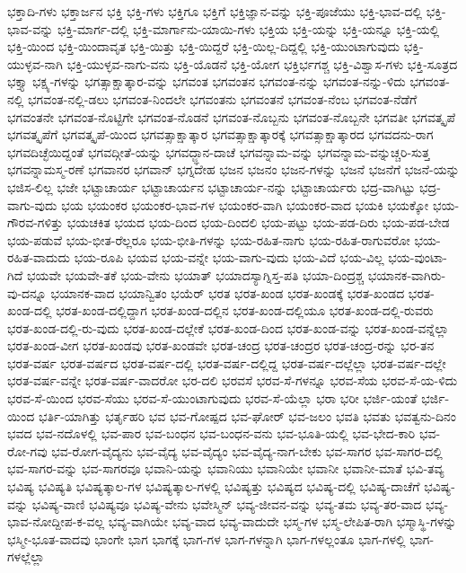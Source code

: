 {ಭಕ್ತಾದಿ-ಗಳು
ಭಕ್ತಾರ್ಜನ
ಭಕ್ತಿ
ಭಕ್ತಿ-ಗಳು
ಭಕ್ತಿಗೂ
ಭಕ್ತಿಗೆ
ಭಕ್ತಿಜ್ಞಾನ-ವನ್ನು
ಭಕ್ತಿ-ಪೂಜೆಯು
ಭಕ್ತಿ-ಭಾವ-ದಲ್ಲಿ
ಭಕ್ತಿ-ಭಾವ-ವನ್ನು
ಭಕ್ತಿ-ಮಾರ್ಗ-ದಲ್ಲಿ
ಭಕ್ತಿ-ಮಾರ್ಗಾನು-ಯಾಯಿ-ಗಳು
ಭಕ್ತಿಯ
ಭಕ್ತಿ-ಯನ್ನು
ಭಕ್ತಿ-ಯನ್ನೂ
ಭಕ್ತಿ-ಯಲ್ಲಿ
ಭಕ್ತಿ-ಯಿಂದ
ಭಕ್ತಿ-ಯಿಂದಾವೃತ
ಭಕ್ತಿ-ಯಿತ್ತು
ಭಕ್ತಿ-ಯಿದ್ದರೆ
ಭಕ್ತಿ-ಯಿಲ್ಲ-ದಿದ್ದಲ್ಲಿ
ಭಕ್ತಿ-ಯುಂಟಾಗುವುದು
ಭಕ್ತಿ-ಯುಳ್ಳವ-ನಾಗಿ
ಭಕ್ತಿ-ಯುಳ್ಳವ-ನಾಗು-ವನು
ಭಕ್ತಿ-ಯೊಡನೆ
ಭಕ್ತಿ-ಯೋಗ
ಭಕ್ತಿರ್ಭಗಶ್ಚ
ಭಕ್ತಿ-ವಿಶ್ವಾಸ-ಗಳು
ಭಕ್ತಿ-ಸೂತ್ರದ
ಭಕ್ತ್ಯಾ
ಭಕ್ಷ್ಯ-ಗಳನ್ನು
ಭಗತ್ಸಾಕ್ಷಾತ್ಕಾರ-ವನ್ನು
ಭಗವಂತ
ಭಗವಂತನ
ಭಗವಂತ-ನನ್ನು
ಭಗವಂತ-ನನ್ನು-ಳಿದು
ಭಗವಂತ-ನಲ್ಲಿ
ಭಗವಂತ-ನಲ್ಲಿ-ಡಲು
ಭಗವಂತ-ನಿಂದಲೇ
ಭಗವಂತನು
ಭಗವಂತನೆ
ಭಗವಂತ-ನೆಂಬ
ಭಗವಂತ-ನೆಡೆಗೆ
ಭಗವಂತನೇ
ಭಗವಂತ-ನೊಟ್ಟಿಗೇ
ಭಗವಂತ-ನೊಡನೆ
ಭಗವಂತ-ನೊಬ್ಬನು
ಭಗವಂತ-ನೊಬ್ಬನೇ
ಭಗವತೀ
ಭಗವತ್ಕೃಪೆ
ಭಗವತ್ಕೃಪೆಗೆ
ಭಗವತ್ಕೃಪೆ-ಯಿಂದ
ಭಗವತ್ಸಾಕ್ಷಾತ್ಕಾರ
ಭಗವತ್ಸಾಕ್ಷಾತ್ಕಾರಕ್ಕೆ
ಭಗವತ್ಸಾಕ್ಷಾತ್ಕಾರದ
ಭಗವದನು-ರಾಗ
ಭಗವದಿಚ್ಛೆಯಿದ್ದಂತೆ
ಭಗವದ್ಗೀತೆ-ಯನ್ನು
ಭಗವದ್ಜ್ಞಾನ-ದಾಚೆ
ಭಗವನ್ನಾಮ-ವನ್ನು
ಭಗವನ್ನಾಮ-ವನ್ನುಚ್ಚರಿ-ಸುತ್ತ
ಭಗವನ್ನಾಮಸ್ಮ-ರಣೆ
ಭಗವಾನರ
ಭಗವಾನ್
ಭಗ್ನದೇಹ
ಭಜನ
ಭಜನಂ
ಭಜನ-ಗಳನ್ನು
ಭಜನೆ
ಭಜನೆಗೆ
ಭಜನೆ-ಯನ್ನು
ಭಜಿಸ-ಲಿಲ್ಲ
ಭಜೇ
ಭಟ್ಟಾಚಾರ್ಯ
ಭಟ್ಟಾಚಾರ್ಯನ
ಭಟ್ಟಾಚಾರ್ಯ-ನನ್ನು
ಭಟ್ಟಾಚಾರ್ಯರು
ಭದ್ರ-ವಾಗಿಟ್ಟು
ಭದ್ರ-ವಾಗು-ವುದು
ಭಯ
ಭಯಂಕರ
ಭಯಂಕರ-ಭಾವ-ಗಳ
ಭಯಂಕರ-ವಾಗಿ
ಭಯಂಕರ-ವಾದ
ಭಯಕಿ
ಭಯಕ್ಕೋ
ಭಯ-ಗೌರವ-ಗಳಿತ್ತು
ಭಯಚಕಿತ
ಭಯದ
ಭಯ-ದಿಂದ
ಭಯ-ದಿಂದಲಿ
ಭಯ-ಪಟ್ಟು
ಭಯ-ಪಡ-ದಿರು
ಭಯ-ಪಡ-ಬೇಡ
ಭಯ-ಪಡುವೆ
ಭಯ-ಭೀತ-ರೆಲ್ಲರೂ
ಭಯ-ಭೀತಿ-ಗಳನ್ನು
ಭಯ-ರಹಿತ-ನಾಗು
ಭಯ-ರಹಿತ-ರಾಗುವರೋ
ಭಯ-ರಹಿತ-ವಾದುದು
ಭಯ-ರೂಪಿ
ಭಯವ
ಭಯ-ವನ್ನೇ
ಭಯ-ವಾಗು-ವುದು
ಭಯ-ವಿದೆ
ಭಯ-ವಿಲ್ಲ
ಭಯ-ವುಂಟಾ-ಗಿದೆ
ಭಯವೇ
ಭಯವೇ-ತಕೆ
ಭಯ-ವೇನು
ಭಯಾತ್
ಭಯಾದಸ್ಯಾಗ್ನಿಸ್ತ-ಪತಿ
ಭಯಾ-ದಿಂದ್ರಶ್ಚ
ಭಯಾನಕ-ವಾಗಿರು-ವು-ದನ್ನೂ
ಭಯಾನಕ-ವಾದ
ಭಯಾನ್ವಿತಂ
ಭಯೆರ್
ಭರತ
ಭರತ-ಖಂಡ
ಭರತ-ಖಂಡಕ್ಕೆ
ಭರತ-ಖಂಡದ
ಭರತ-ಖಂಡ-ದಲ್ಲಿ
ಭರತ-ಖಂಡ-ದಲ್ಲಿದ್ದಾಗ
ಭರತ-ಖಂಡ-ದಲ್ಲಿನ
ಭರತ-ಖಂಡ-ದಲ್ಲಿಯೂ
ಭರತ-ಖಂಡ-ದಲ್ಲಿ-ರುವರು
ಭರತ-ಖಂಡ-ದಲ್ಲಿ-ರು-ವುದು
ಭರತ-ಖಂಡ-ದಲ್ಲೇಕೆ
ಭರತ-ಖಂಡ-ದಿಂದ
ಭರತ-ಖಂಡ-ವನ್ನು
ಭರತ-ಖಂಡ-ವನ್ನೆಲ್ಲಾ
ಭರತ-ಖಂಡ-ವೀಗ
ಭರತ-ಖಂಡವು
ಭರತ-ಖಂಡವೇ
ಭರತ-ಚಂದ್ರ
ಭರತ-ಚಂದ್ರರ
ಭರತ-ಚಂದ್ರ-ರನ್ನು
ಭರ-ತನ
ಭರತ-ವರ್ಷ
ಭರತ-ವರ್ಷದ
ಭರತ-ವರ್ಷ-ದಲ್ಲಿ
ಭರತ-ವರ್ಷ-ದಲ್ಲಿದ್ದ
ಭರತ-ವರ್ಷ-ದಲ್ಲೆಲ್ಲಾ
ಭರತ-ವರ್ಷ-ದಲ್ಲೇ
ಭರತ-ವರ್ಷ-ವನ್ನೇ
ಭರತ-ವರ್ಷ-ವಾದರೋ
ಭರ-ದಲಿ
ಭರವಸೆ
ಭರವ-ಸೆ-ಗಳನ್ನೂ
ಭರವ-ಸೆಯ
ಭರವ-ಸೆ-ಯ-ಳಿದು
ಭರವ-ಸೆ-ಯಿಂದ
ಭರವ-ಸೆಯು
ಭರವ-ಸೆ-ಯುಂಟಾಗುವುದು
ಭರವ-ಸೆ-ಯೆಲ್ಲಾ
ಭರಾ
ಭರೀ
ಭರ್ಜಿ-ಯಂತೆ
ಭರ್ಜಿ-ಯಿಂದ
ಭರ್ತಿ-ಯಾಗಿತ್ತು
ಭರ್ತೃಹರಿ
ಭವ
ಭವ-ಗೋಷ್ಪದ
ಭವ-ಘೋರ್
ಭವ-ಜಲಂ
ಭವತಿ
ಭವತು
ಭವತ್ವನು-ದಿನಂ
ಭವದ
ಭವ-ನದೊಳಲ್ಲಿ
ಭವ-ಪಾರ
ಭವ-ಬಂಧನ
ಭವ-ಬಂಧನ-ವನು
ಭವ-ಭೂತಿ-ಯಲ್ಲಿ
ಭವ-ಭೇದ-ಕಾರಿ
ಭವ-ರೋ-ಗವು
ಭವ-ರೋಗ-ವೈದ್ಯನು
ಭವ-ವೈದ್ಯ
ಭವ-ವೈದ್ಯಂ
ಭವ-ವೈದ್ಯ-ನಾಗ-ಬೇಕು
ಭವ-ಸಾಗರ
ಭವ-ಸಾಗರ-ದಲ್ಲಿ
ಭವ-ಸಾಗರ-ವನ್ನು
ಭವ-ಸಾಗರವೂ
ಭವಾನಿ-ಯನ್ನು
ಭವಾನಿಯು
ಭವಾನಿಯೇ
ಭವಾನೀ
ಭವಾನೀ-ಮಾತೆ
ಭವಿ-ತವ್ಯ
ಭವಿಷ್ಯ
ಭವಿಷ್ಯತಿ
ಭವಿಷ್ಯತ್ಕಾಲ-ಗಳ
ಭವಿಷ್ಯತ್ಕಾಲ-ಗಳಲ್ಲಿ
ಭವಿಷ್ಯತ್ತು
ಭವಿಷ್ಯದ
ಭವಿಷ್ಯ-ದಲ್ಲಿ
ಭವಿಷ್ಯ-ದಾಚೆಗೆ
ಭವಿಷ್ಯ-ವನ್ನು
ಭವಿಷ್ಯ-ವಾಣಿ
ಭವಿಷ್ಯವೂ
ಭವಿಷ್ಯ-ವೇನು
ಭವೇಸ್ಮಿನ್
ಭವ್ಯ-ಜೀವನ-ವನ್ನು
ಭವ್ಯ-ತಮ
ಭವ್ಯ-ತರ-ವಾದ
ಭವ್ಯ-ಭಾವ-ನೋದ್ದೀಪ-ಕ-ವಲ್ಲ
ಭವ್ಯ-ವಾಗಿಯೇ
ಭವ್ಯ-ವಾದ
ಭವ್ಯ-ವಾದುದೇ
ಭಸ್ಮ-ಗಳ
ಭಸ್ಮ-ಲೇಪಿತ-ರಾಗಿ
ಭಸ್ಮಾಸ್ಥಿ-ಗಳನ್ನು
ಭಸ್ಮೀ-ಭೂತ-ವಾದವು
ಭಾಂಗೇ
ಭಾಗ
ಭಾಗಕ್ಕೆ
ಭಾಗ-ಗಳ
ಭಾಗ-ಗಳನ್ನಾಗಿ
ಭಾಗ-ಗಳಲ್ಲಂತೂ
ಭಾಗ-ಗಳಲ್ಲಿ
ಭಾಗ-ಗಳಲ್ಲೆಲ್ಲಾ
}
